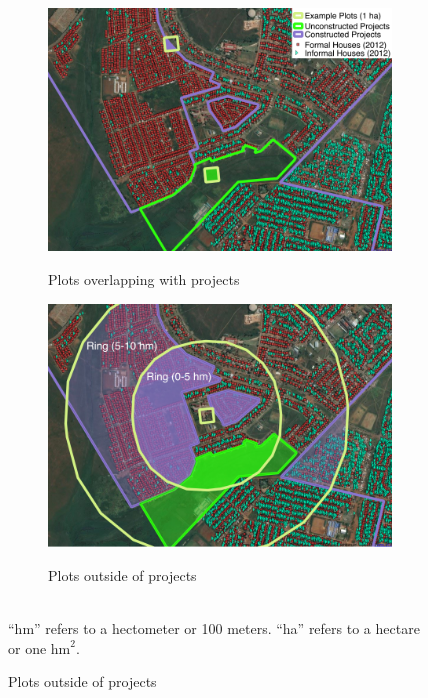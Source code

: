 \documentclass[12pt]{article}
\newcommand{\hmrefha}{
	``hm'' refers to a hectometer or 100 meters. ``ha'' refers to a hectare or one $\text{hm}^{2}$.
}
\begin{document}
\begin{figure}[hbtp]
    \caption{Measuring Spatial Exposure to \\ Example Housing Projects}
    \label{fig:spatialexposure}
    \centering
    \vspace{2mm}
    \begin{subfigure}[b]{.8\textwidth}
        \centering
        \caption[]{\small Plots overlapping with projects}  
        \vspace{-1mm}
        \includegraphics[width=\textwidth,trim={.2cm .2cm .2cm 0cm}, clip=true]{figures/hm_proj_75.png}
        \label{fig:insideproj}
    \end{subfigure}
    \vskip 1mm \vskip 0pt
    \begin{subfigure}[b]{.8\textwidth}  
        \centering 
        \caption[]{\small Plots outside of projects}
        \vspace{-1mm}
        \includegraphics[width=\textwidth,trim={.2cm .2cm .2cm 0cm}, clip=true]{figures/hm_spill_75.png}
        \label{fig:outsideproj}
    \end{subfigure}\\
    {\footnotesize \hmrefha}
\end{figure} 
\end{document}

